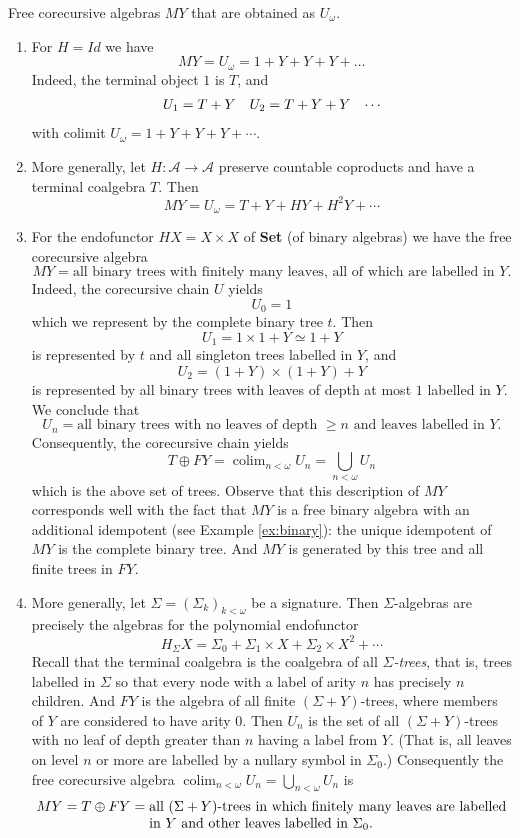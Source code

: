 \documentclass{LMCS}
\theoremstyle{plain}
\theoremstyle{definition}
\numberwithin{equation}{section}
\def\colim{\mathop{\mathrm{colim}}}
\begin{document}
\begin{exa}\label{some exams}
Free corecursive algebras $MY$ that are obtained as $U_\omega$.
\begin{enumerate}
\item For $H=Id$ we have
$$MY=U_\omega= 1+Y+Y+Y+\ldots$$
Indeed, the terminal object $1$ is $T$, and
\begin{align}
U_1&=T+Y&
U_2&=T+Y+Y&
\cdots\notag
\end{align}
with colimit $U_\omega=1+Y+Y+Y+\cdots$.

\item More generally, let $H:\mathcal A\rightarrow \mathcal A$ preserve countable coproducts and have a terminal coalgebra $T$. Then $$MY=U_\omega=T+Y+HY+H^2Y+\cdots$$

\item For the endofunctor $HX=X\times X$ of {\bf Set} (of binary algebras) we have the free corecursive algebra
$$MY=\text{all binary trees with finitely many leaves, all of which are labelled in $Y$.}$$
Indeed, the corecursive chain $U$ yields
$$U_0=1$$
which we represent by the complete binary tree $t$. Then
$$U_1=1\times 1+Y \simeq 1+Y$$
is represented by $t$ and all singleton trees labelled in $Y$, and
$$U_2=(1+Y)\times (1+Y)+Y$$
is represented by all binary trees with leaves of depth at most $1$ labelled in $Y$.
We conclude that
$$U_n=\text{all binary trees with no leaves of depth $\geq n$ and leaves labelled in $Y$}.$$
Consequently, the corecursive chain yields
$$T\oplus FY=\colim_{n<\omega}U_n=\bigcup_{n<\omega}U_n$$
which is the above set of trees. Observe that this description of $MY$
corresponds well with the fact that $MY$ is a free binary algebra with
an additional idempotent (see Example \ref{ex:binary}): the unique
idempotent of $MY$ is the complete binary tree. And $MY$ is generated
by this tree and all finite trees in $FY$.

\item More generally, let $\Sigma=(\Sigma_k)_{k<\omega}$ be a signature. Then $\Sigma$-algebras are precisely the algebras for the polynomial
endofunctor
$$H_\Sigma X=\Sigma_0+\Sigma_1\times X+\Sigma_2\times X^2+\cdots$$
Recall that the terminal coalgebra is the coalgebra of all {\it $\Sigma $-trees}, that is, trees labelled in $\Sigma$ so that every node with a label of arity $n$ has precisely $n$ children. And $FY$ is the algebra of all finite $(\Sigma+Y)$-trees, where members of $Y$ are considered to have arity $0$. Then $U_n$ is the set of all $(\Sigma+Y)$-trees with no leaf of depth greater than $n$ having a label from $Y$. (That is, all leaves on level $n$ or more are labelled by a nullary symbol in $\Sigma_0$.) Consequently the free corecursive algebra $\colim_{n<\omega}U_n=\bigcup_{n<\omega}U_n$ is
\[
MY=T\oplus FY= \parbox[t]{9cm}{all $(\Sigma+Y)$-trees in which finitely many leaves
are labelled in $Y$ and other leaves labelled in $\Sigma_0$.}
\]


\end{enumerate}
\end{exa}
\end{document}
